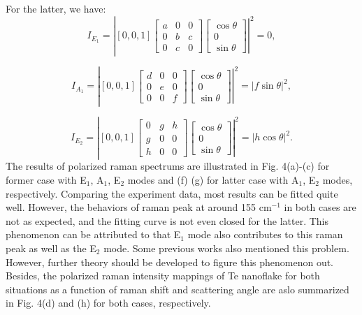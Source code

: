 \documentclass[journal=jacsat,manuscript=article]{achemso}
\begin{document}
For the latter, we have:
\begin{equation}
I_{E_{1}} = \left|\left.[0, 0, 1]\left[\begin{array}{ccc}
a & 0 & 0 \\
0 & b & c \\
0 & c & 0
\end{array}\right]\left[\begin{array}{c}
\cos \theta \\
0 \\
\sin \theta
\end{array}\right]\right|^{2} = 0,\right.
\end{equation}

\begin{equation}
I_{A_{1}} = \left|\left.[0, 0, 1]\left[\begin{array}{ccc}
d & 0 & 0 \\
0 & e & 0 \\
0 & 0 & f
\end{array}\right]\left[\begin{array}{c}
\cos \theta \\
0 \\
\sin \theta
\end{array}\right]\right|^{2} = \left|f \sin \theta\right|^{2},\right.
\end{equation}

\begin{equation}
I_{E_{2}} = \left|\left.[0, 0, 1]\left[\begin{array}{ccc}
0 & g & h \\
g & 0 & 0 \\
h & 0 & 0
\end{array}\right]\left[\begin{array}{c}
\cos \theta \\
0 \\
\sin \theta
\end{array}\right]\right|^{2} = \left|h \cos \theta\right|^{2}.\right.
\end{equation}
The results of polarized raman spectrums are illustrated in Fig. 4(a)-(c) for former case with E$_1$, A$_1$, E$_2$ modes and (f) (g) for latter case with A$_1$, E$_2$ modes, respectively. Comparing the experiment data, most results can be fitted quite well. However, the behaviors of raman peak at around 155 cm$^{-1}$ in both cases are not as expected, and the fitting curve is not even closed for the latter. This phenomenon can be attributed to that E$_1$ mode also contributes to this raman peak as well as the E$_2$ mode. Some previous works also mentioned this problem\cite{tong2020stable,qin2020raman}. However, further theory should be developed to figure this phenomenon out. Besides, the polarized raman intensity mappings of Te nanoflake for both situations as a function of raman shift and scattering angle are aslo summarized in Fig. 4(d) and (h) for both cases, respectively.     
\end{document}
